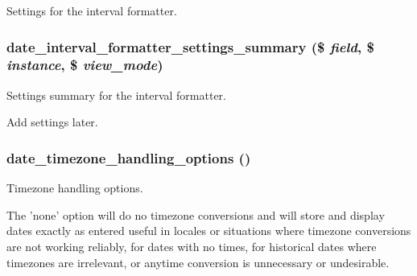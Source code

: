 \label{date__admin_8inc_a5dee3173cbdd9a679fb2820e328d1bda}
Settings for the interval formatter. \hypertarget{date__admin_8inc_afa08535c924eb68cc497eb5e770026e5}{
\subsubsection[{date\_\-interval\_\-formatter\_\-settings\_\-summary}]{\setlength{\rightskip}{0pt plus 5cm}date\_\-interval\_\-formatter\_\-settings\_\-summary (\$ {\em field}, \/  \$ {\em instance}, \/  \$ {\em view\_\-mode})}}
\label{date__admin_8inc_afa08535c924eb68cc497eb5e770026e5}
Settings summary for the interval formatter.

Add settings later. \hypertarget{date__admin_8inc_a25691fb6b96ef1555014c00568485635}{
\subsubsection[{date\_\-timezone\_\-handling\_\-options}]{\setlength{\rightskip}{0pt plus 5cm}date\_\-timezone\_\-handling\_\-options ()}}
\label{date__admin_8inc_a25691fb6b96ef1555014c00568485635}
Timezone handling options.

The 'none' option will do no timezone conversions and will store and display dates exactly as entered useful in locales or situations where timezone conversions are not working reliably, for dates with no times, for historical dates where timezones are irrelevant, or anytime conversion is unnecessary or undesirable. 